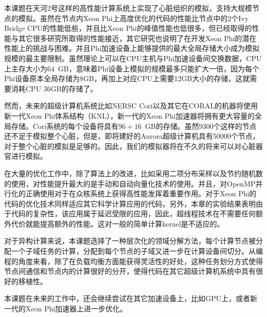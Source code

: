 本课题在天河2号这样的高性能计算系统上实现了心脏组织的模拟，支持大规模节点的模拟。虽然在节点内Xeon Phi上高度优化的代码的性能比节点中的2个Ivy Bridge CPU的性能低些，并且比Xeon Phi的峰值性能也低很多，但已经取得的性能与其它很多研究所取得的性能接近，其它研究也说明了在开发Xeon Phi的潜在性能上的挑战与困难。并且Phi加速设备上能够提供的最大全局存储大小成为模拟规模的最主要限制。虽然理论上可以在CPU主机与Phi加速设备间交换数据，CPU上主存大小为$64$~GB，意味着Phi设备上模拟的规模最多只能扩大一倍，因为每个Phi设备原本全局存储为8GB，再加上对应CPU上需要12GB大小的存储，这就需要消耗CPU 36GB的存储了。

然而，未来的超级计算机系统比如NERSC Cori以及其它在CORAL的机器将使用新一代Xeon Phi体系结构（KNL），新一代的Xeon Phi加速器将拥有更大容量的全局存储。Cori系统的每个设备将具有$96+16$~GB的存储。虽然9300个这样的节点还不足于模拟整个心脏，但是，即将建好的Aurora超级计算机具有50000个节点，对于整个心脏的模拟是足够的。因此，我们的模拟器将在不久的将来可以对心脏器官进行模拟。

在大量的优化工作中，除了算法上的改进，比如采用二项分布采样以及节约随机数的使用，对性能提升最大的是手动和自动向量化技术的使用。并且，对OpenMP并行化的正确使用对于在众核系统上获得高性能发挥着重要作用。对于Xeon Phi的代码的优化技术同样适应其它科学计算应用的代码，另外，本章的实验结果表明由于代码的复杂性，该应用属于延迟受限的应用，因此，超线程技术在不需要任何额外代价就能提高额外的性能。这对一般的简单计算kernel是不适应的。

对于异构计算来说，本课题选择了一种层次化的领域分解方法，每个计算节点被分配一个子域任务的计算，分配到每个节点的子域又进一步在计算设备间切分。从编程的角度来看，除了在负载均衡方面能获得灵活性的好处，这种任务划分方式使得节点间通信和节点内的计算很好的分开，使得代码在其它超级计算机系统中具有很好的移植性。

本课题在未来的工作中，还会继续尝试在其它加速设备上，比如GPU上，或者新一代的Xeon Phi加速器上进一步优化。
